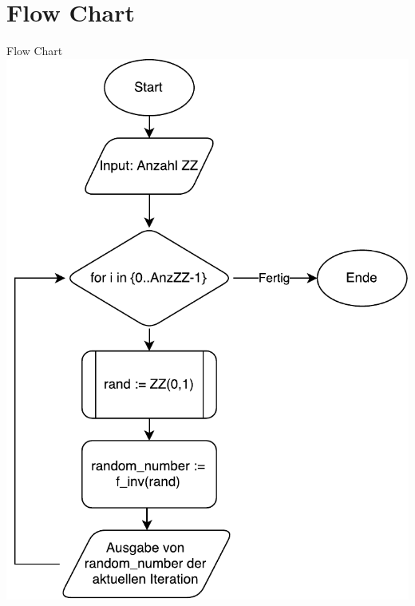 \section{Flow Chart}
\begin{frame}{Flow Chart}
	\centering
  	\includegraphics[scale=0.4]{BSP16_FlowChart.pdf}
\end{frame}


